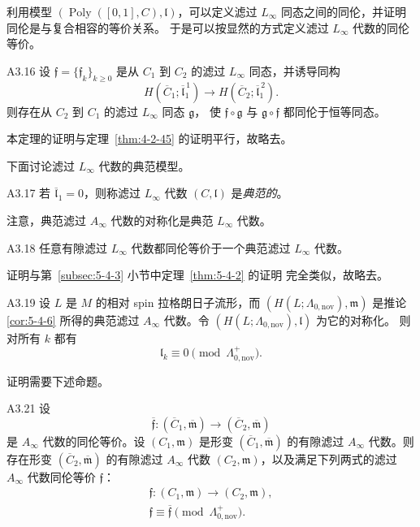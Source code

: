 利用模型
$(\operatorname{Poly}([0,1],C),\mathfrak l)$，可以定义滤过
$L_\infty$ 同态之间的同伦，并证明同伦是与复合相容的等价关系。
于是可以按显然的方式定义滤过 $L_\infty$ 代数的同伦等价。

\begin{theorem}{A3.16}\label{thm:a3-16}
设 $\mathfrak f=\{\mathfrak f_k\}_{k\geq0}$ 是从 $C_1$ 到 $C_2$
的滤过 $L_\infty$ 同态，并诱导同构
\[
 H(\overline C_1;\overline{\mathfrak l}^{\,1}_1)
 \longrightarrow
 H(\overline C_2;\overline{\mathfrak l}^{\,2}_1).
\]
则存在从 $C_2$ 到 $C_1$ 的滤过 $L_\infty$ 同态 $\mathfrak g$，
使 $\mathfrak f\circ\mathfrak g$ 与
$\mathfrak g\circ\mathfrak f$ 都同伦于恒等同态。
\end{theorem}

本定理的证明与定理~\ref{thm:4-2-45} 的证明平行，故略去。

下面讨论滤过 $L_\infty$ 代数的典范模型。

\begin{definition}{A3.17}\label{def:a3-17}
若 $\overline{\mathfrak l}_1=0$，则称滤过 $L_\infty$ 代数
$(C,\mathfrak l)$ 是\emph{典范的}。
\end{definition}

注意，典范滤过 $A_\infty$ 代数的对称化是典范 $L_\infty$ 代数。

\begin{theorem}{A3.18}\label{thm:a3-18}
任意有隙滤过 $L_\infty$ 代数都同伦等价于一个典范滤过
$L_\infty$ 代数。
\end{theorem}

证明与第~\ref{subsec:5-4-3} 小节中定理~\ref{thm:5-4-2} 的证明
完全类似，故略去。

\begin{theorem}{A3.19}\label{thm:a3-19}
设 $L$ 是 $M$ 的相对 spin 拉格朗日子流形，而
$(H(L;\Lambda_{0,\mathrm{nov}}),\mathfrak m)$ 是推论
\ref{cor:5-4-6} 所得的典范滤过 $A_\infty$ 代数。令
$(H(L;\Lambda_{0,\mathrm{nov}}),\mathfrak l)$ 为它的对称化。
则对所有 $k$ 都有
\begin{equation}
 \mathfrak l_k\equiv0\pmod{\Lambda^+_{0,\mathrm{nov}}}.
 \tag{A3.20}\label{eq:a3-20}
\end{equation}
\end{theorem}

证明需要下述命题。

\begin{proposition}{A3.21}\label{prop:a3-21}
设
\[
 \overline{\mathfrak f}\colon
 (\overline C_1,\overline{\mathfrak m})
 \longrightarrow
 (\overline C_2,\overline{\mathfrak m})
\]
是 $A_\infty$ 代数的同伦等价。设
$(C_1,\mathfrak m)$ 是形变
$(\overline C_1,\overline{\mathfrak m})$ 的有隙滤过
$A_\infty$ 代数。则存在形变
$(\overline C_2,\overline{\mathfrak m})$ 的有隙滤过
$A_\infty$ 代数 $(C_2,\mathfrak m)$，以及满足下列两式的滤过
$A_\infty$ 代数同伦等价 $\mathfrak f$：
\[
\begin{gathered}
 \mathfrak f\colon(C_1,\mathfrak m)
 \longrightarrow(C_2,\mathfrak m),\\
 \mathfrak f\equiv\overline{\mathfrak f}
 \pmod{\Lambda^+_{0,\mathrm{nov}}}.
\end{gathered}
\]
\end{proposition}

